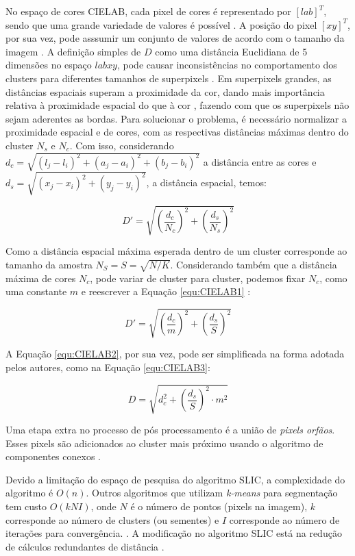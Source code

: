 \begin{document}
No espaço de cores CIELAB, cada pixel de cores é representado por $[l a b]^T$, sendo que uma grande variedade de valores é possível \cite{SLIC}. A posição do pixel $[x y]^T$, por sua vez, pode asssumir um conjunto de valores de acordo com o tamanho da imagem \cite{SLIC}. A definição simples de $D$ como uma distância Euclidiana de 5 dimensões no espaço $labxy$, pode causar inconsistências no comportamento dos clusters para diferentes tamanhos de superpixels \cite{SLIC}. Em superpixels grandes, as distâncias espaciais superam a proximidade da cor, dando mais importância relativa à proximidade espacial do que à cor \cite{SLIC}, fazendo com que os superpixels não sejam aderentes as bordas. Para solucionar o problema, é necessário normalizar a proximidade espacial e de cores, com as respectivas distâncias máximas dentro do cluster $N_s$ e $N_c$. Com isso, considerando $d_c = \sqrt{(l_j - l_i)^2 + (a_j - a_i)^2 + (b_j - b_i)^2}$ a distância entre as cores e $d_s =  \sqrt{(x_j - x_i)^2 + (y_j - y_i)^2}$, a distância espacial, temos:

\begin{equation}
 D' = \sqrt{ \left(\frac{d_c}{N_c} \right)^2 + \left(\frac{d_s}{N_s} \right)^2}
 \label{equ:CIELAB1}
\end{equation}

Como a distância espacial máxima esperada dentro de um cluster corresponde ao tamanho da amostra $N_S = S = \sqrt{N/K}$. Considerando também que a distância máxima de cores $N_c$, pode variar de cluster para cluster, podemos fixar $N_c$, como uma constante $m$ e reescrever a Equação \ref{equ:CIELAB1} \cite{SLIC}:

\begin{equation}
 D' = \sqrt{ \left(\frac{d_c}{m} \right)^2 + \left(\frac{d_s}{S} \right)^2}
 \label{equ:CIELAB2}
\end{equation}

A Equação \ref{equ:CIELAB2}, por sua vez, pode ser simplificada na forma adotada pelos autores, como na Equação \ref{equ:CIELAB3}:

\begin{equation}
 D = \sqrt{d_c^2 + \left(\frac{d_s}{S} \right)^2 \cdot m^2}
 \label{equ:CIELAB3}
\end{equation}

Uma etapa extra no processo de pós processamento é a união de \textit{pixels orfãos}. Esses pixels são adicionados ao cluster mais próximo usando o algoritmo de componentes conexos \cite{SLIC}.

Devido a limitação do espaço de pesquisa do algoritmo SLIC, a complexidade do algoritmo é $O(n)$. Outros algoritmos que utilizam \textit{k-means} para segmentação tem custo $O(kNI)$, onde $N$ é o número de pontos (pixels na imagem), $k$ corresponde ao número de clusters (ou sementes) e $I$ corresponde ao número de iterações para convergência.  \cite{SLIC1}. A modificação no algoritmo SLIC está na redução de cálculos redundantes de distância \cite{SLIC1}. 
\end{document}
